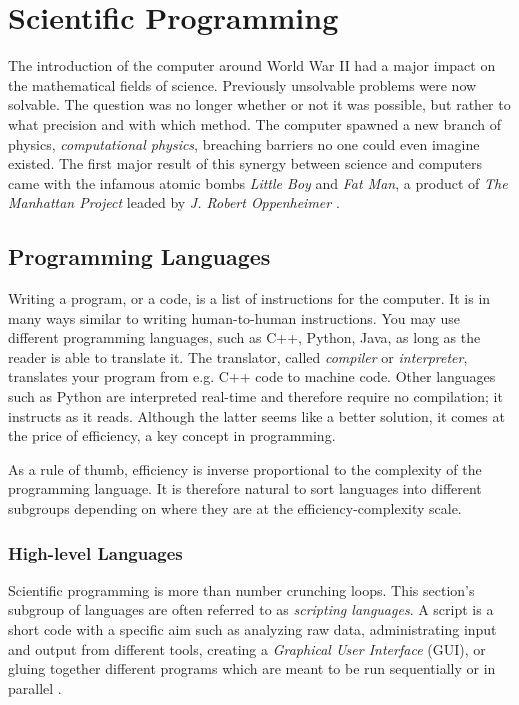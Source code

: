 \chapter{Scientific Programming}
\label{ch:SciProg}

The introduction of the computer around World War II had a major impact on the mathematical fields of science. Previously unsolvable problems were now  solvable. The question was no longer whether or not it was possible, but rather to what precision and with which method. The computer spawned a new branch of physics, \textit{computational physics}, breaching barriers no one could even imagine existed. The first major result of this synergy between science and computers came with the infamous atomic bombs \textit{Little Boy} and \textit{Fat Man}, a product of \textit{The Manhattan Project} leaded by \textit{J. Robert Oppenheimer} \cite{supermen}.

\section{Programming Languages}

Writing a program, or a code, is a list of instructions for the computer. It is in many ways similar to writing human-to-human instructions. You may use different programming languages, such as C++, Python, Java, as long as the reader is able to translate it. The translator, called \textit{compiler} or \textit{interpreter}, translates your program from e.g. C++ code to machine code. Other languages such as Python are interpreted real-time and therefore require no compilation; it instructs as it reads. Although the latter seems like a better solution, it comes at the price of efficiency, a key concept in programming. 

As a rule of thumb, efficiency is inverse proportional to the complexity of the programming language. It is therefore natural to sort languages into different subgroups depending on where they are at the efficiency-complexity scale.


\subsection{High-level Languages}

Scientific programming is more than number crunching loops. This section's subgroup of languages are often referred to as \textit{scripting languages}. A script is a short code with a specific aim such as analyzing raw data, administrating input and output from different tools, creating a \textit{Graphical User Interface} (GUI), or gluing together different programs which are meant to be run sequentially or in parallel \cite{inf3331}.

